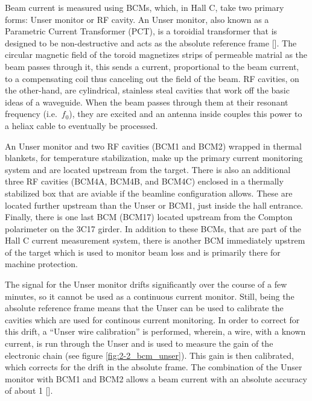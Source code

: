 \documentclass[
]{report}
\begin{document}
Beam current is measured using BCMs, which, in Hall C, take two primary
forms: Unser monitor or RF cavity. An Unser monitor, also known as a
Parametric Current Transformer (PCT), is a toroidial transformer that is
designed to be non-destructive and acts as the absolute reference frame
{[}\cite{unser_parametric_1992}{]}. The circular magnetic field of the
toroid magnetizes strips of permeable matrial as the beam passes through
it, this sends a current, proportional to the beam current, to a
compensating coil thus canceling out the field of the beam. RF cavities,
on the other-hand, are cylindrical, stainless steal cavities that work
off the basic ideas of a waveguide. When the beam passes through them at
their resonant frequency (i.e.~\(f_0\)), they are excited and an antenna
inside couples this power to a heliax cable to eventually be processed.

An Unser monitor and two RF cavities (BCM1 and BCM2) wrapped in thermal
blankets, for temperature stabilization, make up the primary current
monitoring system and are located upstream from the target. There is
also an additional three RF cavities (BCM4A, BCM4B, and BCM4C) enclosed
in a thermally stabilized box that are aviable if the beamline
configuration allows. These are located further upstream than the Unser
or BCM1, just inside the hall entrance. Finally, there is one last BCM
(BCM17) located upstream from the Compton polarimeter on the 3C17
girder. In addition to these BCMs, that are part of the Hall C current
measurement system, there is another BCM immediately upstrem of the
target which is used to monitor beam loss and is primarily there for
machine protection.



The signal for the Unser monitor drifts significantly over the course of
a few minutes, so it cannot be used as a continuous current monitor.
Still, being the absolute reference frame means that the Unser can be
used to calibrate the cavities which are used for continous current
monitoring. In order to correct for this drift, a ``Unser wire
calibration'' is performed, wherein, a wire, with a known current, is
run through the Unser and is used to measure the gain of the electronic
chain (see figure \ref{fig:2-2_bcm_unser}). This gain is then
calibrated, which corrects for the drift in the absolute frame. The
combination of the Unser monitor with BCM1 and BCM2 allows a beam
current with an absolute accuracy of about 1
{[}\cite{denard_high_2001}{]}.
\end{document}
